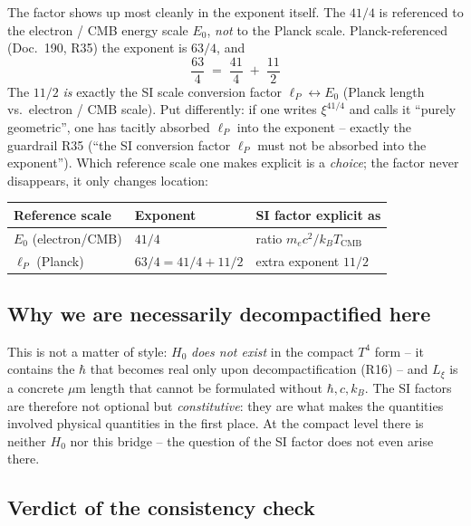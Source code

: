 The factor shows up most cleanly in the exponent itself. The $41/4$ is
referenced to the electron / CMB energy scale $E_0$, \emph{not} to the Planck
scale. Planck-referenced (Doc.~190, R35) the exponent is $63/4$, and
\begin{equation}
  \boxed{\;\frac{63}{4} \;=\; \frac{41}{4} \;+\; \frac{11}{2}\;}
  \label{eq:exp-split}
\end{equation}
The $11/2$ \emph{is} exactly the SI scale conversion factor
$\ell_P \leftrightarrow E_0$ (Planck length vs.\ electron / CMB scale). Put
differently: if one writes $\xi^{41/4}$ and calls it \enquote{purely
geometric}, one has tacitly absorbed $\ell_P$ into the exponent -- exactly the
guardrail R35 (\enquote{the SI conversion factor $\ell_P$ must not be absorbed
into the exponent}). Which reference scale one makes explicit is a \emph{choice};
the factor never disappears, it only changes location:
\begin{center}
{\small
\renewcommand{\arraystretch}{1.3}
\begin{tabular}{p{4.4cm}p{4.4cm}p{4.4cm}}
\toprule
\textbf{Reference scale} & \textbf{Exponent} & \textbf{SI factor explicit as} \\
\midrule
$E_0$ (electron/CMB) & $41/4$ & ratio $m_ec^2/k_BT_\text{CMB}$ \\
$\ell_P$ (Planck)    & $63/4 = 41/4 + 11/2$ & extra exponent $11/2$ \\
\bottomrule
\end{tabular}
}
\end{center}

\subsection*{Why we are necessarily decompactified here}

This is not a matter of style: $H_0$ \emph{does not exist} in the compact $T^4$
form -- it contains the $\hbar$ that becomes real only upon decompactification
(R16) -- and $L_\xi$ is a concrete $\mu$m length that cannot be formulated
without $\hbar, c, k_B$. The SI factors are therefore not optional but
\emph{constitutive}: they are what makes the quantities involved physical
quantities in the first place. At the compact level there is neither $H_0$ nor
this bridge -- the question of the SI factor does not even arise there.

\subsection*{Verdict of the consistency check}


